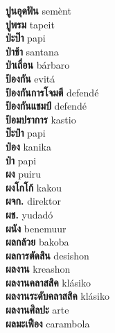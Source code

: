 \textbf{ ปูนอุดฟัน  } semènt \\
\textbf{ ปูพรม  } tapeit \\
\textbf{ ป่ะป๊า  } papi \\
\textbf{ ป่าช้า  } santana \\
\textbf{ ป่าเถื่อน  } bárbaro \\
\textbf{ ป้องกัน  } evitá \\
\textbf{ ป้องกันการโจมตี  } defendé \\
\textbf{ ป้องกันแชมป์  } defendé \\
\textbf{ ป้อมปราการ  } kastio \\
\textbf{ ป๊ะป๋า  } papi \\
\textbf{ ป๋อง  } kanika \\
\textbf{ ป๋า  } papi \\
\textbf{ ผง  } puiru \\
\textbf{ ผงโกโก้  } kakou \\
\textbf{ ผจก.  } direktor \\
\textbf{ ผช.  } yudadó \\
\textbf{ ผนัง  } benemuur \\
\textbf{ ผลกล้วย  } bakoba \\
\textbf{ ผลการตัดสิน  } desishon \\
\textbf{ ผลงาน  } kreashon \\
\textbf{ ผลงานคลาสสิค  } klásiko \\
\textbf{ ผลงานระดับคลาสสิค  } klásiko \\
\textbf{ ผลงานศิลปะ  } arte \\
\textbf{ ผลมะเฟือง  } carambola \\

